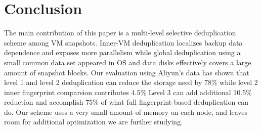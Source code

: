 \section{Conclusion}
\label{sect:final}
The main contribution of this paper is a multi-level selective deduplication scheme among VM snapshots. 
Inner-VM deduplication localizes backup data dependence and exposes more parallelism  
while global deduplication using a small common data set appeared in OS and data disks
effectively  covers a large amount of snapshot blocks.
Our evaluation using Aliyun's data has shown that 
level 1 and level 2 deduplication can reduce the storage need by 78\% while level 2 inner 
fingerprint comparsion contributes 4.5\%%
Level 3 can add additional 10.5\% reduction and accomplish 75\% of what full fingerprint-based
deduplication can do. Our scheme uses a very small amount of memory on each node, and leaves
room for additional optimization we are further studying.
 
%
%

